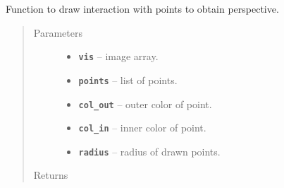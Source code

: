 \documentclass[letterpaper,10pt,english]{sphinxmanual}
\begin{document}
\begin{fulllineitems}
\label{RRtoolbox.lib:RRtoolbox.lib.image.drawcoorperspective}
Function to draw interaction with points to obtain perspective.
\begin{quote}\begin{description}
\item[{Parameters}] \leavevmode\begin{itemize}
\item {} 
\textbf{\texttt{vis}} -- image array.

\item {} 
\textbf{\texttt{points}} -- list of points.

\item {} 
\textbf{\texttt{col\_out}} -- outer color of point.

\item {} 
\textbf{\texttt{col\_in}} -- inner color of point.

\item {} 
\textbf{\texttt{radius}} -- radius of drawn points.

\end{itemize}

\item[{Returns}] \leavevmode


\end{description}\end{quote}

\end{fulllineitems}

\end{document}
